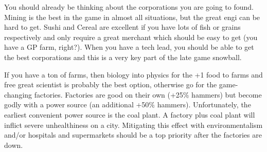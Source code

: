 \documentclass[10pt]{article}
\begin{document}
You should already be thinking about the corporations you are going to
found. Mining is the best in the game in almost all situations, but
the great engi can be hard to get. Sushi and Cereal are excellent if
you have lots of fish or grains respectively and only require a great
merchant which should be easy to get (you have a GP farm,
right?). When you have a tech lead, you should be able to get the best
corporations and this is a very key part of the late game snowball.

If you have a ton of farms, then biology into physics for the +1 food
to farms and free great scientist is probably the best option,
otherwise go for the game-changing factories. Factories are good on
their own (+25\% hammers) but become godly with a power source (an
additional +50\% hammers). Unfortunately, the earliest convenient
power source is the coal plant. A factory plus coal plant will inflict
severe unhealthiness on a city. Mitigating this effect with
environmentalism and/or hospitals and supermarkets should be a top
priority after the factories are down.
\end{document}
